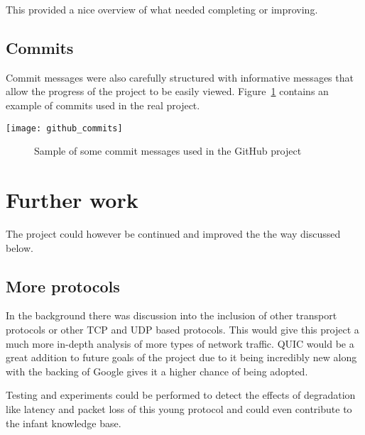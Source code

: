 This provided a nice overview of what needed completing or improving.

\subsection{Commits}
Commit messages were also carefully structured with informative messages that allow the progress of the project to be easily viewed. Figure~\ref{ref:githubCommits} contains an example of commits used in the real project.

\begin{center}
	\texttt{[image: github\_commits]}
	\begin{figure}[h]
		\caption{Sample of some commit messages used in the GitHub project}
		\label{ref:githubCommits}
	\end{figure}
\end{center}

\section{Further work}
The project could however be continued and improved the the way discussed below.

\subsection{More protocols}
In the background there was discussion into the inclusion of other transport protocols or other TCP and UDP based protocols. This would give this project a much more in-depth analysis of more types of network traffic. QUIC would be a great addition to future goals of the project due to it being incredibly new along with the backing of Google gives it a higher chance of being adopted. 

Testing and experiments could be performed to detect the effects of degradation like latency and packet loss of this young protocol and could even contribute to the infant knowledge base.


